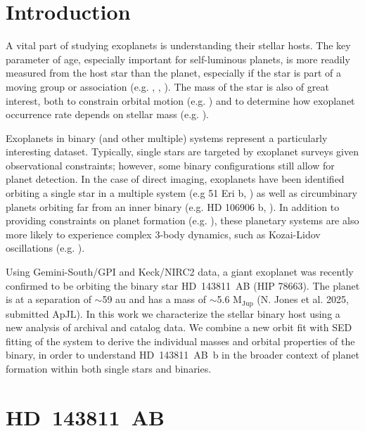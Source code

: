 \documentclass[]{aastex701} %
\begin{document}

\section{Introduction} 

A vital part of studying exoplanets is understanding their stellar hosts. The key parameter of age, especially important for self-luminous planets, is more readily measured from the host star than the planet, especially if the star is part of a moving group or association (e.g. \citealt{lagrange:2010}, \citealt{rameau:2013}, \citealt{gagne:2018}). The mass of the star is also of great interest, both to constrain orbital motion (e.g. \citealt{derosa:2015}) and to determine how exoplanet occurrence rate depends on stellar mass (e.g. \citealt{johnson:2010, nielsen:2019}).

Exoplanets in binary (and other multiple) systems represent a particularly interesting dataset. Typically, single stars are targeted by exoplanet surveys given observational constraints; however, some binary configurations still allow for planet detection. In the case of direct imaging, exoplanets have been identified orbiting a single star in a multiple system (e.g 51 Eri b, \citealt{macintosh:2015}) as well as circumbinary planets orbiting far from an inner binary (e.g. HD 106906 b, \citealt{bailey:2014}). In addition to providing constraints on planet formation (e.g. \citealt{kraus:2016}), these planetary systems are also more likely to experience complex 3-body dynamics, such as Kozai-Lidov oscillations (e.g. \citealt{cheetham:2018}).

Using Gemini-South/GPI and Keck/NIRC2 data, a giant exoplanet was recently confirmed to be orbiting the binary star HD~143811~AB (HIP 78663). The planet is at a separation of $\sim$59 au and has a mass of $\sim$5.6 M$_{\textrm{Jup}}$ (N. Jones et al. 2025, submitted ApJL). In this work we characterize the stellar binary host using a new analysis of archival and catalog data. We combine a new orbit fit with SED fitting of the system to derive the individual masses and orbital properties of the binary, in order to understand HD~143811~AB~b in the broader context of planet formation within both single stars and binaries.

\section{HD~143811~AB}
\end{document}
